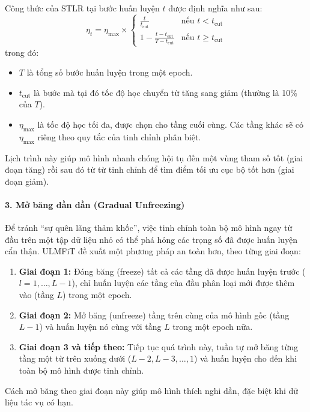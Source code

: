 Công thức của STLR tại bước huấn luyện $t$ được định nghĩa như sau:
\begin{equation}
\eta_t = \eta_{\max} \times
\begin{cases}
    \frac{t}{t_{\text{cut}}} & \text{nếu } t < t_{\text{cut}} \\
    1 - \frac{t - t_{\text{cut}}}{T - t_{\text{cut}}} & \text{nếu } t \ge t_{\text{cut}}
\end{cases}
\label{eq:stlr}
\end{equation}
trong đó:
\begin{itemize}
    \item $T$ là tổng số bước huấn luyện trong một epoch.
    \item $t_{\text{cut}}$ là bước mà tại đó tốc độ học chuyển từ tăng sang giảm (thường là 10\% của $T$).
    \item $\eta_{\max}$ là tốc độ học tối đa, được chọn cho tầng cuối cùng. Các tầng khác sẽ có $\eta_{\max}$ riêng theo quy tắc của tinh chỉnh phân biệt.
\end{itemize}
Lịch trình này giúp mô hình nhanh chóng hội tụ đến một vùng tham số tốt (giai đoạn tăng) rồi sau đó từ từ tinh chỉnh để tìm điểm tối ưu cục bộ tốt hơn (giai đoạn giảm).

\paragraph{3. Mở băng dần dần (Gradual Unfreezing)}
Để tránh “sự quên lãng thảm khốc”, việc tinh chỉnh toàn bộ mô hình ngay từ đầu trên một tập dữ liệu nhỏ có thể phá hỏng các trọng số đã được huấn luyện cẩn thận. ULMFiT đề xuất một phương pháp an toàn hơn, theo từng giai đoạn:

\begin{enumerate}
    \item \textbf{Giai đoạn 1:} Đóng băng (freeze) tất cả các tầng đã được huấn luyện trước ($l=1, \dots, L-1$), chỉ huấn luyện các tầng của đầu phân loại mới được thêm vào (tầng $L$) trong một epoch.
    \item \textbf{Giai đoạn 2:} Mở băng (unfreeze) tầng trên cùng của mô hình gốc (tầng $L-1$) và huấn luyện nó cùng với tầng $L$ trong một epoch nữa.
    \item \textbf{Giai đoạn 3 và tiếp theo:} Tiếp tục quá trình này, tuần tự mở băng từng tầng một từ trên xuống dưới ($L-2, L-3, \dots, 1$) và huấn luyện cho đến khi toàn bộ mô hình được tinh chỉnh.
\end{enumerate}
Cách mở băng theo giai đoạn này giúp mô hình thích nghi dần, đặc biệt khi dữ liệu tác vụ có hạn.

